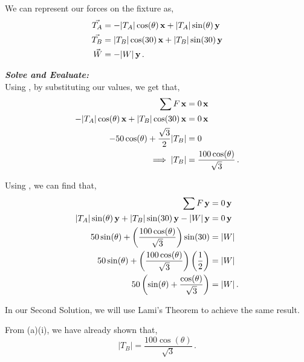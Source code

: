 \begin{subquestions}
\begin{subsubquestions}
We can represent our forces on the fixture as,
\begin{align}
	\vec{T_A} & = -|T_A|\cos(\theta)\,\mathbf{x} +|T_A|\sin(\theta)\,\mathbf{y}  \\
	\vec{T_B} & = |T_B|\cos(30)\,\mathbf{x}+|T_B|\sin(30)\,\mathbf{y}  \\ 
	\vec{W} & = -|W|\,\mathbf{y} \,.
\end{align}




\textbf{\textit{Solve and Evaluate:}} \\
Using , by substituting our values, we get that,
\begin{align}
	\sum F \,\mathbf{x} & = 0 \,\mathbf{x} \nonumber \\
	-|T_A|\cos(\theta)\,\mathbf{x} +  |T_B|\cos(30)\,\mathbf{x} & = 0 \,\mathbf{x} \nonumber \\
	-50\cos(\theta) + \frac{\sqrt{3}}{2}|T_B| & = 0 \nonumber \\
	\implies |T_B| & = \frac{100\cos(\theta)}{\sqrt{3}} \,.
\end{align}

Using , we can find that,
\begin{align}
	\sum F \,\mathbf{y} & = 0 \,\mathbf{y} \nonumber \\
	|T_A|\sin(\theta)\,\mathbf{y} + |T_B|\sin(30)\,\mathbf{y} -|W|\,\mathbf{y} & = 0 \,\mathbf{y} \nonumber \\
	50\sin(\theta) + \left(\frac{100\cos(\theta)}{\sqrt{3}}\right)\sin(30) & = |W| \nonumber \\
	50\sin(\theta) + \left(\frac{100\cos(\theta)}{\sqrt{3}}\right)\left(\frac{1}{2}\right) & = |W|\nonumber \\
	50 \left(\sin(\theta) + \frac{\cos(\theta)}{\sqrt{3}}\right) & = |W| \,.
\end{align}

In our Second Solution, we will use Lami's Theorem to achieve the same result.


\subsubquestion
From (a)(i), we have already shown that,
\begin{equation}
	|T_B| = \frac{100\cos(\theta)}{\sqrt{3}} \,.
\end{equation}

\end{subsubquestions}



\end{subquestions}
